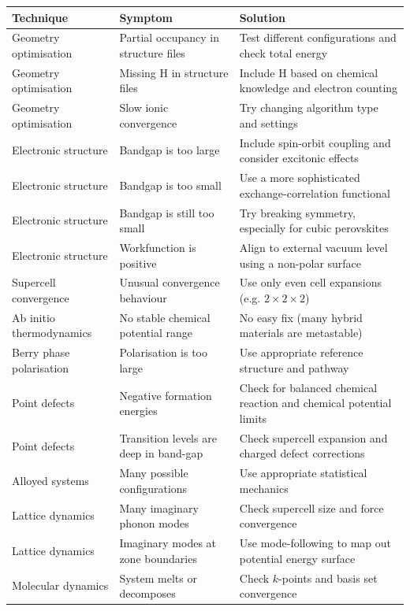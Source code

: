 \begin{landscape}
\begin{table}[tb]\centering
\begin{tabular}{p{5cm}p{7cm}p{10cm}}
\toprule
Technique & Symptom & Solution \\
\midrule
Geometry  optimisation & Partial occupancy in structure files & Test different configurations and check total energy \\
Geometry  optimisation & Missing H in structure files & Include H based on chemical knowledge and electron counting  \\
Geometry  optimisation & Slow ionic convergence & Try changing algorithm type and settings \\
Electronic structure & Bandgap is too large & Include spin-orbit coupling and consider excitonic effects \\
Electronic structure & Bandgap is too small & Use a more sophisticated exchange-correlation functional \\
Electronic structure & Bandgap is still too small & Try breaking symmetry, especially for cubic perovskites \\
Electronic structure & Workfunction is  positive & Align to external vacuum level using a non-polar surface  \\
Supercell convergence & Unusual convergence behaviour & Use only even cell expansions (e.g. $2\times2\times2$) \\
Ab initio  thermodynamics & No stable chemical  potential range & No easy fix (many hybrid materials are metastable) \\
Berry phase polarisation & Polarisation is too large & Use appropriate reference  structure and pathway \\
Point defects & Negative formation  energies & Check for balanced chemical reaction and chemical potential limits \\
Point defects & Transition levels are deep in band-gap & Check supercell expansion and charged defect corrections \\
Alloyed systems & Many possible  configurations & Use appropriate statistical  mechanics \\
Lattice dynamics & Many imaginary phonon modes & Check supercell size and force convergence \\
Lattice dynamics & Imaginary modes at zone boundaries & Use mode-following to map out potential energy surface \\
Molecular dynamics & System melts or  decomposes & Check $k$-points and basis set convergence \\

\end{tabular}
\end{table}
\end{landscape}
